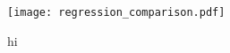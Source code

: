 \documentclass[../main.tex]{subfiles}
\begin{document}




%




\begin{figure}[h]
\begin{center}
\texttt{[image: regression\_comparison.pdf]}
\caption{hi}
\label{fig:regression_comp}
\end{center}
\end{figure}





\end{document}
